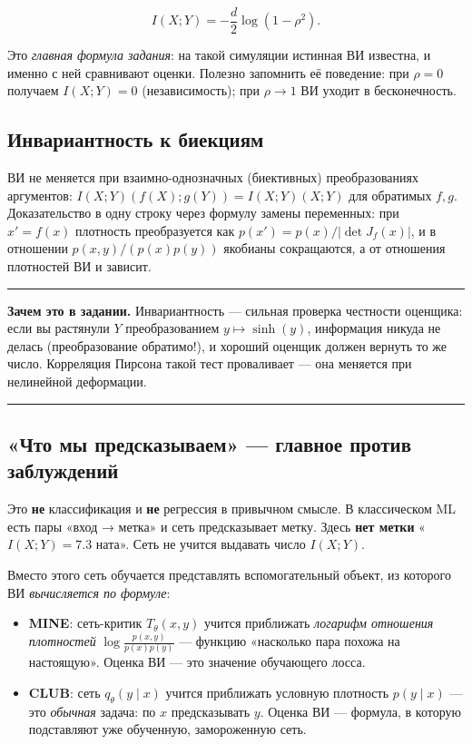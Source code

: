 \documentclass[11pt]{article}
\newcommand{\MI}{I(X;Y)}
\newenvironment{exbox}{%
  \par\medskip\noindent
  \begin{minipage}[t]{\linewidth}
  \color{accent}\rule[2pt]{\linewidth}{0.6pt}\color{black}
  \vspace{0.4em}\noindent\small
}{%
  \vspace{0.4em}
  \color{accent}\rule[2pt]{\linewidth}{0.6pt}\color{black}
  \end{minipage}\par\medskip
}
\begin{document}
\begin{equation}\label{eq:gauss_mi}
\MI = -\frac{d}{2}\log(1-\rho^2).
\end{equation}

Это \emph{главная формула задания}: на такой симуляции истинная ВИ известна, и именно с ней сравнивают оценки. Полезно запомнить её поведение: при $\rho=0$ получаем $\MI=0$ (независимость); при $\rho\to1$ ВИ уходит в бесконечность.

\subsection{Инвариантность к биекциям}

ВИ не меняется при взаимно-однозначных (биективных) преобразованиях аргументов: $\MI(f(X);g(Y))=\MI(X;Y)$ для обратимых $f,g$. Доказательство в одну строку через формулу замены переменных: при $x'=f(x)$ плотность преобразуется как $p(x')=p(x)/|\det J_f(x)|$, и в отношении $p(x,y)/(p(x)p(y))$ якобианы сокращаются, а от отношения плотностей ВИ и зависит.

\begin{exbox}
\textbf{Зачем это в задании.} Инвариантность — сильная проверка честности оценщика: если вы растянули $Y$ преобразованием $y\mapsto\sinh(y)$, информация никуда не делась (преобразование обратимо!), и хороший оценщик должен вернуть то же число. Корреляция Пирсона такой тест проваливает — она меняется при нелинейной деформации.
\end{exbox}

\subsection{«Что мы предсказываем» — главное против заблуждений}

Это \textbf{не} классификация и \textbf{не} регрессия в привычном смысле. В классическом ML есть пары «вход → метка» и сеть предсказывает метку. Здесь \textbf{нет метки} «$\MI=7.3$ ната». Сеть не учится выдавать число $\MI$.

Вместо этого сеть обучается представлять вспомогательный объект, из которого ВИ \emph{вычисляется по формуле}:

\begin{itemize}
\item \textbf{MINE}: сеть-критик $T_\theta(x,y)$ учится приближать \emph{логарифм отношения плотностей} $\log\frac{p(x,y)}{p(x)p(y)}$ — функцию «насколько пара похожа на настоящую». Оценка ВИ — это значение обучающего лосса.
\item \textbf{CLUB}: сеть $q_\theta(y\mid x)$ учится приближать условную плотность $p(y\mid x)$ — это \emph{обычная} задача: по $x$ предсказывать $y$. Оценка ВИ — формула, в которую подставляют уже обученную, замороженную сеть.
\end{itemize}
\end{document}
